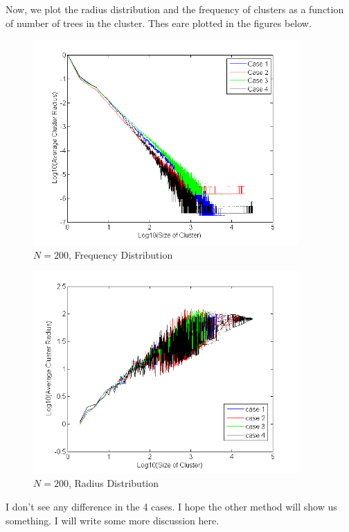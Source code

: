 \documentclass[11pt]{article}
\begin{document}
Now, we plot the radius distribution and the frequency of clusters as a function of number of trees in the cluster. Thes eare plotted in the figures below.


\begin{figure}[H]
\centering
\includegraphics[width=0.9\textwidth,keepaspectratio=true,]{Pictures/frequency_distribution_4_different_cases.png}
\caption{$N=200$, Frequency Distribution}
\end{figure}

\begin{figure}[H]
\centering
\includegraphics[width=0.9\textwidth,keepaspectratio=true,]{Pictures/radius_4_cases.png}
\caption{$N=200$, Radius Distribution}
\end{figure}

I don't see any difference in the 4 cases. I hope the other method will show us something.
I will write some more discussion here.
\end{document}

